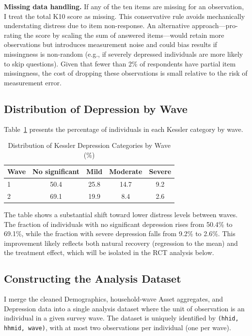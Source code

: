 \documentclass[12pt]{article}
\begin{document}
\textbf{Missing data handling.} If any of the ten items are missing for an observation, I treat the total K10 score as missing. This conservative rule avoids mechanically understating distress due to item non-response. An alternative approach---pro-rating the score by scaling the sum of answered items---would retain more observations but introduces measurement noise and could bias results if missingness is non-random (e.g., if severely depressed individuals are more likely to skip questions). Given that fewer than 2\% of respondents have partial item missingness, the cost of dropping these observations is small relative to the risk of measurement error.


\subsection{Distribution of Depression by Wave}

Table~\ref{tab:kessler_wave} presents the percentage of individuals in each Kessler category by wave.

\begin{table}[H]
\centering
\caption{Distribution of Kessler Depression Categories by Wave (\%)}
\label{tab:kessler_wave}
\begin{tabular}{lcccc}
\toprule
Wave & No significant & Mild & Moderate & Severe \\
\midrule
1 & 50.4 & 25.8 & 14.7 & 9.2 \\
2 & 69.1 & 19.9 &  8.4 & 2.6 \\
\bottomrule
\end{tabular}
\end{table}

The table shows a substantial shift toward lower distress levels between waves. The fraction of individuals with no significant depression rises from 50.4\% to 69.1\%, while the fraction with severe depression falls from 9.2\% to 2.6\%. This improvement likely reflects both natural recovery (regression to the mean) and the treatment effect, which will be isolated in the RCT analysis below.


\subsection{Constructing the Analysis Dataset}

I merge the cleaned Demographics, household-wave Asset aggregates, and Depression data into a single analysis dataset where the unit of observation is an individual in a given survey wave. The dataset is uniquely identified by \texttt{(hhid, hhmid, wave)}, with at most two observations per individual (one per wave).
\end{document}
